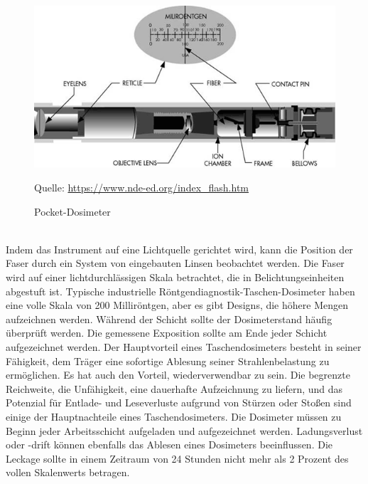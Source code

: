 {\begin{figure}[htb]
  \includegraphics[scale=0.3]{img/dose.png}
  \caption{Pocket-Dosimeter}
  \label{fig:Pocket-Dosimeter}
  Quelle: \url{https://www.nde-ed.org/index_flash.htm}
\end{figure}\\


Indem das Instrument auf eine Lichtquelle gerichtet wird, kann die Position der Faser durch ein System von eingebauten Linsen beobachtet werden. Die Faser wird auf einer lichtdurchlässigen Skala betrachtet, die in Belichtungseinheiten abgestuft ist. Typische industrielle Röntgendiagnostik-Taschen-Dosimeter haben eine volle Skala von 200 Milliröntgen, aber es gibt Designs, die höhere Mengen aufzeichnen werden. Während der Schicht sollte der Dosimeterstand häufig überprüft werden. Die gemessene Exposition sollte am Ende jeder Schicht aufgezeichnet werden.
Der Hauptvorteil eines Taschendosimeters besteht in seiner Fähigkeit, dem Träger eine sofortige Ablesung seiner Strahlenbelastung zu ermöglichen. Es hat auch den Vorteil, wiederverwendbar zu sein. Die begrenzte Reichweite, die Unfähigkeit, eine dauerhafte Aufzeichnung zu liefern, und das Potenzial für Entlade- und Leseverluste aufgrund von Stürzen oder Stoßen sind einige der Hauptnachteile eines Taschendosimeters. Die Dosimeter müssen zu Beginn jeder Arbeitsschicht aufgeladen und aufgezeichnet werden. Ladungsverlust oder -drift können ebenfalls das Ablesen eines Dosimeters beeinflussen. Die Leckage sollte in einem Zeitraum von 24 Stunden nicht mehr als 2 Prozent des vollen Skalenwerts betragen.
}
